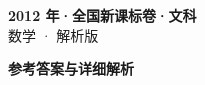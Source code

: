 \documentclass[zihao=-4, a4paper]{ctexart}
\begin{document}
\begin{center}
  {\Large\bfseries 2012 年·全国新课标卷·文科}\\[4pt]
  {\large 数学 · 解析版}
\end{center}
\medskip
{}

\clearpage
{}
\begin{center}{\Large\bfseries 参考答案与详细解析}\end{center}
\medskip

\end{document}

